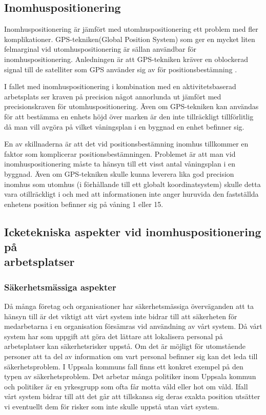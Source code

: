 \documentclass[swedish, a4paper,12pt]{article}
\begin{document}
\subsection{Inomhuspositionering}
Inomhuspositionering är jämfört med utomhuspositionering ett problem med fler komplikationer. GPS-tekniken(Global Position System) som ger en mycket liten felmarginal vid utomhuspositionering är sällan användbar för inomhuspositionering. Anledningen är att GPS-tekniken kräver en oblockerad signal till de satelliter som GPS använder sig av för positionsbestämning \cite{GPS_US_ACCURACY}.

I fallet med inomhuspositionering i kombination med en aktivitetsbaserad arbetsplats ser kraven på precision något annorlunda ut jämfört med precisionskraven för utomhuspositionering. Även om GPS-tekniken kan användas för att bestämma en enhets höjd över marken är den inte tillräckligt tillförlitlig då man vill avgöra på vilket våningsplan i en byggnad en enhet befinner sig.

En av skillnaderna är att det vid positionsbestämning inomhus tillkommer en faktor som komplicerar positionsbestämningen. Problemet är att man vid inomhuspositionering måste ta hänsyn till ett visst antal våningsplan i en byggnad. Även om GPS-tekniken skulle kunna leverera lika god precision inomhus som utomhus (i förhållande till ett globalt koordinatsystem) skulle detta vara otillräckligt i och med att informationen inte anger huruvida den fastställda enhetens position befinner sig på våning 1 eller 15.

\subsection{Icketekniska aspekter vid inomhuspositionering på \\arbetsplatser}

\subsubsection{Säkerhetsmässiga aspekter}
Då många företag och organisationer har säkerhetsmässiga överväganden att ta hänsyn till är det viktigt att vårt system inte bidrar till att säkerheten för medarbetarna i en organisation försämras vid användning av vårt system.
Då vårt system har som uppgift att göra det lättare att lokalisera personal på arbetsplatser kan säkerhetsrisker uppstå. Om det är möjligt för utomstående personer att ta del av information om vart personal befinner sig kan det leda till säkerhetsproblem. I Uppsala kommuns fall finns ett konkret exempel på den typen av säkerhetsproblem. Det arbetar många politiker inom Uppsala kommun och politiker är en yrkesgrupp som ofta får motta våld eller hot om våld. Ifall vårt system bidrar till att det går att tillskansa sig deras exakta position utsätter vi eventuellt dem för risker som inte skulle uppstå utan vårt system.
\end{document}
